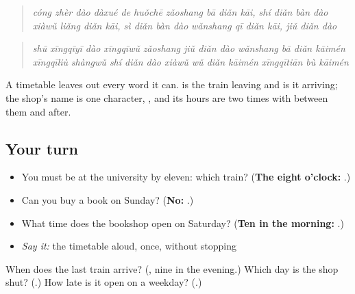 \begin{tcolorbox}[breakable,skin=enhanced,colback=orange!6,colframe=orange!45!black,boxrule=0.5pt,arc=1mm,left=6pt,right=6pt,top=4pt,bottom=4pt,fonttitle=\bfseries,title={Read this}]
\begin{quote}
\emph{cóng zhèr dào dàxué de huǒchē} \emph{zǎoshang bā diǎn kāi, shí diǎn bàn dào} \emph{xiàwǔ liǎng diǎn kāi, sì diǎn bàn dào} \emph{wǎnshang qī diǎn kāi, jiǔ diǎn dào}
\end{quote}

\begin{quote}
\emph{shū} \emph{xīngqīyī dào xīngqīwǔ} \emph{zǎoshang jiǔ diǎn dào wǎnshang bā diǎn kāimén} \emph{xīngqīliù} \emph{shàngwǔ shí diǎn dào xiàwǔ wǔ diǎn kāimén} \emph{xīngqītiān bù kāimén}
\end{quote}

A timetable leaves out every word it can.  is the train leaving and  is it arriving; the shop's name is one character, , and its hours are two times with  between them and  after.
\end{tcolorbox}

\subsection*{Your turn}
\begin{itemize}
\raggedright
  \item You must be at the university by eleven: which train? (\textbf{The eight o'clock:  }.)
  \item Can you buy a book on Sunday? (\textbf{No: }.)
  \item What time does the bookshop open on Saturday? (\textbf{Ten in the morning: }.)
\end{itemize}

\begin{itemize}
\raggedright
  \item \emph{Say it:} the timetable aloud, once, without stopping
\end{itemize}

\begin{tcolorbox}[breakable,colback=teal!4,colframe=teal!35!black,title={Before you move on}]
When does the last train arrive? (\textbf{}, nine in the evening.) Which day is the shop shut? (\textbf{}.) How late is it open on a weekday? (\textbf{}.)
\end{tcolorbox}
